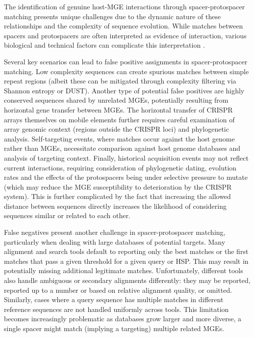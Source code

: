 \documentclass[
]{article}
\begin{document}
The identification of genuine host-MGE interactions through
spacer-protospacer matching presents unique challenges due to the
dynamic nature of these relationships and the complexity of sequence
evolution. While matches between spacers and protospacers are often
interpreted as evidence of interaction, various biological and technical
factors can complicate this interpretation
\autocite{Edwards2015_phage_host,soto_perez_crispr_2019}.

Several key scenarios can lead to false positive assignments in
spacer-protospacer matching. Low complexity sequences can create
spurious matches between simple repeat regions (albeit these can be
mitigated through complexity filtering via Shannon entropy or DUST).
Another type of potential false positives are highly conserved sequences
shared by unrelated MGEs, potentially resulting from horizontal gene
transfer between MGEs. The horizontal transfer of CRISPR arrays
themselves on mobile elements further requires careful examination of
array genomic context (regions outside the CRISPR loci) and phylogenetic
analysis. Self-targeting events, where matches occur against the host
genome rather than MGEs, necessitate comparison against host genome
databases and analysis of targeting context. Finally, historical
acquisition events may not reflect current interactions, requiring
consideration of phylogenetic dating, evolution rates and the effects of
the protospacers being under selective pressure to mutate (which may
reduce the MGE susceptibility to deterioration by the CRISPR system).
This is further complicated by the fact that increasing the allowed
distance between sequences directly increases the likelihood of
considering sequences similar or related to each other.

False negatives present another challenge in spacer-protospacer
matching, particularly when dealing with large databases of potential
targets. Many alignment and search tools default to reporting only the
best matches or the first matches that pass a given threshold for a
given query or HSP. This may result in potentially missing additional
legitimate matches. Unfortunately, different tools also handle ambiguous
or secondary alignments differently: they may be reported, reported up
to a number or based on relative alignment quality, or omitted.
Similarly, cases where a query sequence has multiple matches in
different reference sequences are not handled uniformly across tools.
This limitation becomes increasingly problematic as databases grow
larger and more diverse, a single spacer might match (implying a
targeting) multiple related MGEs.
\end{document}
